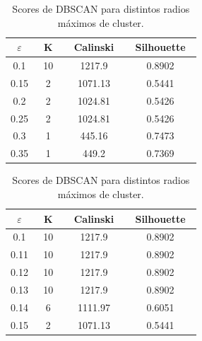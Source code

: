\documentclass[oneside]{book}
\begin{document}
\begin{table}[H]
  \centering
\begin{tabular}{|c|ccc|}
  \hline
   ~\hspace{2mm}$\varepsilon$\hspace{2mm}~ & ~\hspace{2mm}K\hspace{2mm}~ & ~\hspace{2mm}Calinski\hspace{2mm}~ & ~\hspace{2mm}Silhouette\hspace{2mm}~ \\ \hline
0.1 & 10 & 1217.9 & 0.8902 \\ \hline
0.15 & 2 & 1071.13 & 0.5441 \\ \hline
0.2 & 2 & 1024.81 & 0.5426 \\ \hline
0.25 & 2 & 1024.81 & 0.5426 \\ \hline
0.3 & 1 & 445.16 & 0.7473 \\ \hline
0.35 & 1 & 449.2 & 0.7369 \\ \hline
\end{tabular}
\quad
\begin{tabular}{|c|ccc|}
  \hline
   ~\hspace{2mm}$\varepsilon$\hspace{2mm}~ & ~\hspace{2mm}K\hspace{2mm}~ & ~\hspace{2mm}Calinski\hspace{2mm}~ & ~\hspace{2mm}Silhouette\hspace{2mm}~ \\ \hline
0.1 & 10 & 1217.9 & 0.8902 \\ \hline
0.11 & 10 & 1217.9 & 0.8902 \\ \hline
0.12 & 10 & 1217.9 & 0.8902 \\ \hline
0.13 & 10 & 1217.9 & 0.8902 \\ \hline
0.14 & 6 & 1111.97 & 0.6051 \\ \hline
0.15 & 2 & 1071.13 & 0.5441 \\ \hline
\end{tabular}
\caption{Scores de DBSCAN para distintos radios máximos de cluster.}
\label{tab:dbscan2}
\end{table}
\end{document}
